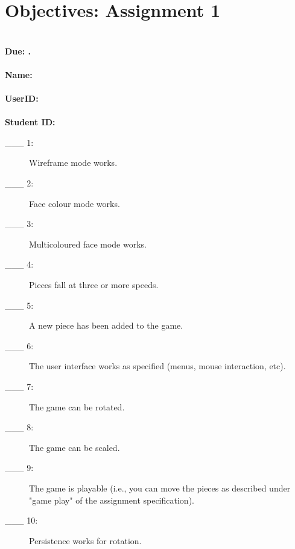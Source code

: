 \section{Objectives: \hfill Assignment 1}
\ \\ {\large \bf Due: \AoneDeadline.} \\
\ \\ {\large \bf Name: \hrulefill} \\
\ \\ {\large \bf UserID: \hrulefill} \\
\ \\ {\large \bf Student ID: \hrulefill} \\
\begin{description}
        \item[\_\_\_ 1:]
          Wireframe mode works.
        \item[\_\_\_ 2:]
          Face colour mode works.
        \item[\_\_\_ 3:]
       	  Multicoloured face mode works.
        \item[\_\_\_ 4:]
          Pieces fall at three or more speeds.
        \item[\_\_\_ 5:]
          A new piece has been added to the game.
        \item[\_\_\_ 6:]
          The user interface works as specified (menus, mouse
          interaction, etc).
        \item[\_\_\_ 7:]
          The game can be rotated.
        \item[\_\_\_ 8:]
          The game can be scaled.
        \item[\_\_\_ 9:]
          The game is playable (i.e., you can move the pieces as described 
		under "game play" of the assignment specification).
        \item[\_\_\_ 10:]
          Persistence works for rotation.
\end{description}



